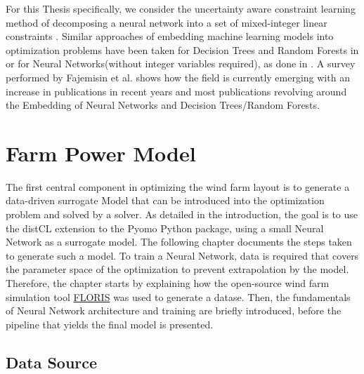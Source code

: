 \documentclass[preprint,12pt]{elsarticle}
\begin{document}
For this Thesis specifically, we consider the uncertainty aware constraint learning method of decomposing a neural network into a set of mixed-integer linear constraints  \cite{ALCANTARA2023120895} \cite{ALCANTARA2025127876}. Similar approaches of embedding machine learning models into optimization problems have been taken for Decision Trees and Random Forests in \cite{preprintBonfiettiEmbeddDecisionTrees} or for Neural Networks(without integer variables required), as done in \cite{dealba2024reformulationembeddingneuralnetwork}. A survey performed by Fajemisin et al.\cite{FAJEMISIN20241} shows how the field is currently emerging with an increase in publications in recent years and most publications revolving around the Embedding of Neural Networks and Decision Trees/Random Forests.



\section{Farm Power Model}\label{chapter:power_model}

The first central component in optimizing the wind farm layout is to generate a data-driven surrogate Model that can be introduced into the optimization problem and solved by a solver. As detailed in the introduction, the goal is to use the distCL extension \cite{alcantara_ruiz_distcl_2022_git} to the Pyomo Python package, using a small Neural Network as a surrogate model. The following chapter documents the steps taken to generate such a model. 
To train a Neural Network, data is required that covers the parameter space of the optimization to prevent extrapolation by the model. Therefore, the chapter starts by explaining how the open-source wind farm simulation tool \href{https://www.nrel.gov/wind/floris.html}{FLORIS} \cite{nrel_floris} was used to generate a datase. Then, the fundamentals of Neural Network architecture and training are briefly introduced, before the pipeline that yields the final model is presented.


\subsection{Data Source}
\end{document}
